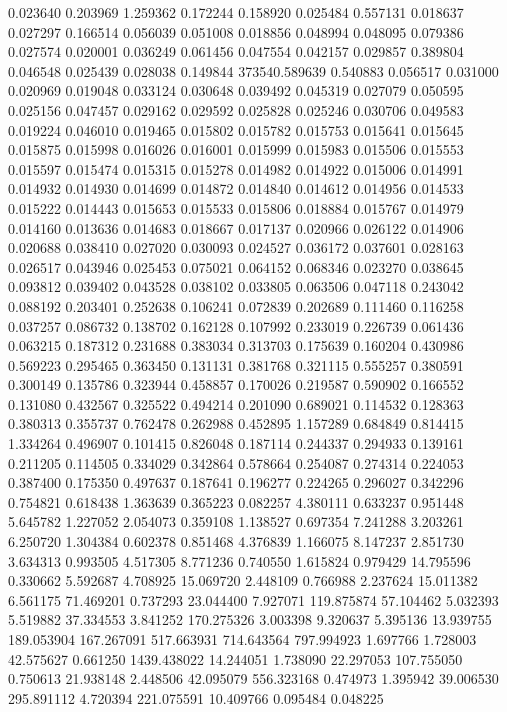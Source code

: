 0.023640
0.203969
1.259362
0.172244
0.158920
0.025484
0.557131
0.018637
0.027297
0.166514
0.056039
0.051008
0.018856
0.048994
0.048095
0.079386
0.027574
0.020001
0.036249
0.061456
0.047554
0.042157
0.029857
0.389804
0.046548
0.025439
0.028038
0.149844
373540.589639
0.540883
0.056517
0.031000
0.020969
0.019048
0.033124
0.030648
0.039492
0.045319
0.027079
0.050595
0.025156
0.047457
0.029162
0.029592
0.025828
0.025246
0.030706
0.049583
0.019224
0.046010
0.019465
0.015802
0.015782
0.015753
0.015641
0.015645
0.015875
0.015998
0.016026
0.016001
0.015999
0.015983
0.015506
0.015553
0.015597
0.015474
0.015315
0.015278
0.014982
0.014922
0.015006
0.014991
0.014932
0.014930
0.014699
0.014872
0.014840
0.014612
0.014956
0.014533
0.015222
0.014443
0.015653
0.015533
0.015806
0.018884
0.015767
0.014979
0.014160
0.013636
0.014683
0.018667
0.017137
0.020966
0.026122
0.014906
0.020688
0.038410
0.027020
0.030093
0.024527
0.036172
0.037601
0.028163
0.026517
0.043946
0.025453
0.075021
0.064152
0.068346
0.023270
0.038645
0.093812
0.039402
0.043528
0.038102
0.033805
0.063506
0.047118
0.243042
0.088192
0.203401
0.252638
0.106241
0.072839
0.202689
0.111460
0.116258
0.037257
0.086732
0.138702
0.162128
0.107992
0.233019
0.226739
0.061436
0.063215
0.187312
0.231688
0.383034
0.313703
0.175639
0.160204
0.430986
0.569223
0.295465
0.363450
0.131131
0.381768
0.321115
0.555257
0.380591
0.300149
0.135786
0.323944
0.458857
0.170026
0.219587
0.590902
0.166552
0.131080
0.432567
0.325522
0.494214
0.201090
0.689021
0.114532
0.128363
0.380313
0.355737
0.762478
0.262988
0.452895
1.157289
0.684849
0.814415
1.334264
0.496907
0.101415
0.826048
0.187114
0.244337
0.294933
0.139161
0.211205
0.114505
0.334029
0.342864
0.578664
0.254087
0.274314
0.224053
0.387400
0.175350
0.497637
0.187641
0.196277
0.224265
0.296027
0.342296
0.754821
0.618438
1.363639
0.365223
0.082257
4.380111
0.633237
0.951448
5.645782
1.227052
2.054073
0.359108
1.138527
0.697354
7.241288
3.203261
6.250720
1.304384
0.602378
0.851468
4.376839
1.166075
8.147237
2.851730
3.634313
0.993505
4.517305
8.771236
0.740550
1.615824
0.979429
14.795596
0.330662
5.592687
4.708925
15.069720
2.448109
0.766988
2.237624
15.011382
6.561175
71.469201
0.737293
23.044400
7.927071
119.875874
57.104462
5.032393
5.519882
37.334553
3.841252
170.275326
3.003398
9.320637
5.395136
13.939755
189.053904
167.267091
517.663931
714.643564
797.994923
1.697766
1.728003
42.575627
0.661250
1439.438022
14.244051
1.738090
22.297053
107.755050
0.750613
21.938148
2.448506
42.095079
556.323168
0.474973
1.395942
39.006530
295.891112
4.720394
221.075591
10.409766
0.095484
0.048225
